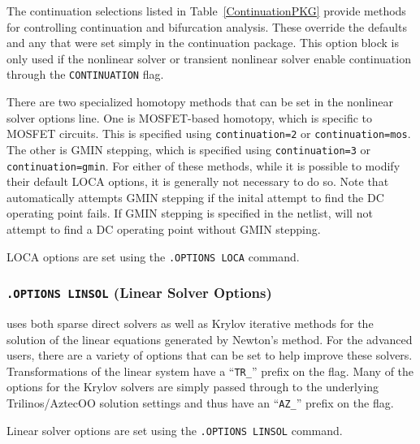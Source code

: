 The continuation selections listed in Table~\ref{ContinuationPKG}
provide methods for controlling continuation and bifurcation analysis.
These override the defaults and any that were set simply in the
continuation package.  This option block is only used if the nonlinear
solver or transient nonlinear solver enable continuation through the
\texttt{CONTINUATION} flag.

There are two specialized homotopy methods that can be set in the nonlinear
solver options line.  One is MOSFET-based homotopy, which is specific to MOSFET
circuits.  This is specified using \texttt{continuation=2} or
\texttt{continuation=mos}.  The other is GMIN stepping, which is specified
using \texttt{continuation=3} or \texttt{continuation=gmin}.  For either of
these methods, while it is possible to modify their default LOCA options, it is
generally not necessary to do so. Note that \Xyce{} automatically attempts GMIN
stepping if the inital attempt to find the DC operating point fails. If GMIN
stepping is specified in the netlist, \Xyce{} will not attempt to find a DC
operating point without GMIN stepping. 

LOCA options are set using the \texttt{.OPTIONS LOCA} command.



\subsubsection{\texttt{.OPTIONS LINSOL} (Linear Solver Options)}

\Xyce{} uses both sparse direct
solvers as well as Krylov iterative
methods
for the solution of the linear equations generated by Newton's method.
For the advanced users, there are a variety of options that can be set
to help improve these solvers.  Transformations of the linear system
have a ``\verb+TR_+'' prefix on the flag.  Many of the options for the
Krylov solvers are simply passed through to the underlying
Trilinos/AztecOO
solution settings and thus have an ``\verb+AZ_+'' prefix on the flag.

Linear solver options are set using the \texttt{.OPTIONS LINSOL}
command.



